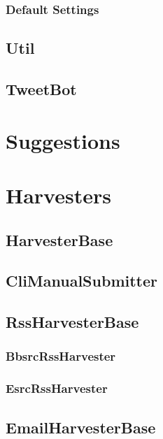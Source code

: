 \subsubsection{Default Settings}

\subsection{Util}

\subsection{TweetBot}

\section{Suggestions}


\section{Harvesters}
\label{design-main-last}

\subsection{HarvesterBase}

\subsection{CliManualSubmitter}

\subsection{RssHarvesterBase}

\subsubsection{BbsrcRssHarvester}

\subsubsection{EsrcRssHarvester}

\subsection{EmailHarvesterBase}

